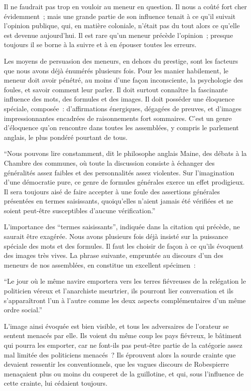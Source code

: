 \documentclass[french,twoside]{book} %
\begin{document}
Il ne faudrait pas trop en vouloir au meneur en question. Il nous a coûté fort cher évidemment ; mais une grande partie de son influence tenait à ce qu’il suivait l’opi­nion publique, qui, en matière coloniale, n’était pas du tout alors ce qu’elle est devenue aujourd’hui. Il est rare qu’un meneur précède l’opinion ; presque toujours il se borne à la suivre et à en épouser toutes les erreurs.\par
Les moyens de persuasion des meneurs, en dehors du prestige, sont les facteurs que nous avons déjà énumérés plusieurs fois. Pour les manier habilement, le meneur doit avoir pénétré, au moins d’une façon inconsciente, la psychologie des foules, et savoir comment leur parler. Il doit surtout connaître la fascinante influence des mots, des formules et des images. Il doit posséder une éloquence spéciale, composée : d’affirmations énergiques, dégagées de preuves, et d’images impressionnantes enca­drées de raisonnements fort sommaires. C’est un genre d’éloquence qu’on rencontre dans toutes les assemblées, y compris le parlement anglais, le plus pondéré pourtant de tous.\par
“Nous pouvons lire constamment, dit le philosophe anglais Maine, des débats à la Chambre des communes, où toute la discussion consiste à échanger des généralités assez faibles et des personnalités assez violentes. Sur l’imagination d’une démocratie pure, ce genre de for­mules générales exerce un effet prodigieux. Il sera toujours aisé de faire accepter à une foule des assertions générales présentées en termes saisissants, quoiqu’elles n’aient jamais été vérifiées et ne soient peut-être susceptibles d’aucune vérification.”\par
L’importance des “termes saisissants”, indiquée dans la citation qui précède, ne saurait être exagérée. Nous avons plusieurs fois déjà insisté sur la puissance spéciale des mots et des formules. Il faut les choisir de façon à ce qu’ils évoquent des images très vives. La phrase suivante, empruntée au discours d’un des meneurs de nos assemblées, en constitue un excellent spécimen :\par
“Le jour où le même navire emportera vers les terres fiévreuses de la relégation le politicien véreux et l’anarchiste meurtrier, ils pourront lier conversation et ils s’apparaîtront l’un à l’autre comme les deux aspects complémentaires d’un même ordre social.”\par
L’image ainsi évoquée est bien visible, et tous les adversaires de l’orateur se sentent menacés par elle. Ils voient du même coup les pays fiévreux, le bâtiment qui pourra les emporter, car ne font-ils pas peut-être partie de la catégorie assez mal limitée des politiciens menacés ? Ils éprouvent alors la sourde crainte que devaient ressentir les conventionnels, que les vagues discours de Robespierre menaçaient plus ou moins du couperet de la guillotine, et qui, sous l’influence de cette crainte, lui cédaient toujours.\par
\end{document}
